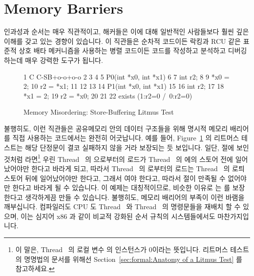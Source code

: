 
\section{Memory Barriers}
\label{sec:advsync:Memory Barriers}

인과성과 순서는 매우 직관적이고, 해커들은 이에 대해 일반적인 사람들보다 훨씬
깊은 이해를 갖고 있는 경향이 있습니다.
이 직관들은 순차적 코드이든 락킹과 RCU 같은 표준적 상호 배타 메커니즘을
사용하는 병렬 코드이든 코드를 작성하고 분석하고 디버깅하는데 매우 강력한 도구가
됩니다.

\begin{figure}
{ \scriptsize
\begin{verbbox}
 1 C C-SB+o-o+o-o
 2 {
 3 }
 4
 5 P0(int *x0, int *x1)
 6 {
 7   int r2;
 8
 9   *x0 = 2;
10   r2 = *x1;
11 }
12
13
14 P1(int *x0, int *x1)
15 {
16   int r2;
17
18   *x1 = 2;
19   r2 = *x0;
20 }
21
22 exists (1:r2=0 /\ 0:r2=0)
\end{verbbox}
}
\centering
\theverbbox
\caption{Memory Misordering: Store-Buffering Litmus Test}
\label{fig:advsync:Memory Misordering: Store-Buffering Litmus Test}
\end{figure}

불행히도, 이런 직관들은 공유메모리 안의 데이터 구조들을 위해 명시적 메모리
배리어를 직접 사용하는 코드에서는 완전히 어긋납니다.
예를 들어,
Figure~\ref{fig:advsync:Memory Misordering: Store-Buffering Litmus Test} 의
리트머스 테스트는 해당 단정문이 결코 실패하지 않을 거라 보장되는 듯 보입니다.
일단,  절에 보인 것처럼  라면\footnote{
	이 말은, Thread~ 의 로컬 변수  의 인스턴스가 0이라는
	뜻입니다.
	리트머스 테스트의 명명법의 문서를 위해선
	Section~\ref{sec:formal:Anatomy of a Litmus Test}
	를 참고하세요.}
우린 Thread~ 의  으로부터의 로드가 Thread~ 의 
에의 스토어 전에 일어났어야만 한다고 바라게 되고, 따라서 Thread~ 의
 로부터의 로드는 Thread~ 의  로틔 스토어 뒤에
일어났어야만 한다고, 그래서  여야 한다고, 따라서  절이
만족될 수 없어야만 한다고 바라게 될 수 있습니다.
이 예제는 대칭적이므로, 비슷한 이유로  는  를
보장한다고 생각하게끔 만들 수 있습니다.
불행히도, 메모리 배리어의 부족이 이런 바램을 깨부십니다.
컴파일러도 CPU 도 Thread~ 와 Thread~ 의 명령문들을 재배치 할
수 있으며, 이는 심지어 x86 과 같이 비교적 강화된 순서 규칙의 시스템들에서도
마찬가지입니다.
\iffalse

